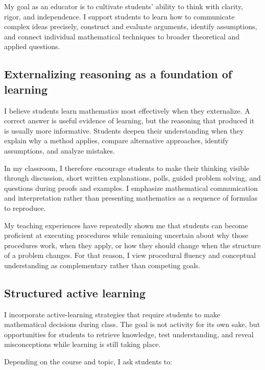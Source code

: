 \documentclass[11pt]{article}
\begin{document}
My goal as an educator is to cultivate students' ability to
think with clarity, rigor, and independence.
I support students to learn how to communicate complex ideas
precisely, construct and evaluate arguments,
identify assumptions,
and connect individual mathematical techniques to broader
theoretical and applied questions.

\subsection{Externalizing reasoning as a foundation of learning}

I believe students learn mathematics most effectively when
they externalize.
A correct answer is useful evidence of learning,
but the reasoning that produced it is usually more informative.
Students deepen their understanding when they explain why a
method applies, compare alternative approaches,
identify assumptions, and analyze mistakes.

In my classroom, I therefore encourage students to make their
thinking visible through discussion,
short written explanations,
polls,
guided problem solving,
and questions during proofs and examples.
I emphasize mathematical communication and interpretation
rather than presenting mathematics as a sequence of formulas
to reproduce.

My teaching experiences have repeatedly shown me that students
can become proficient at executing procedures while remaining
uncertain about why those procedures work,
when they apply,
or how they should change when the structure of a problem
changes.
For that reason, I view procedural fluency and conceptual
understanding as complementary rather than competing goals.

\subsection{Structured active learning}

I incorporate active-learning strategies that require students
to make mathematical decisions during class.
The goal is not activity for its own sake,
but opportunities for students to retrieve knowledge,
test understanding,
and reveal misconceptions while learning is still taking
place.

Depending on the course and topic, I ask students to:
\end{document}
